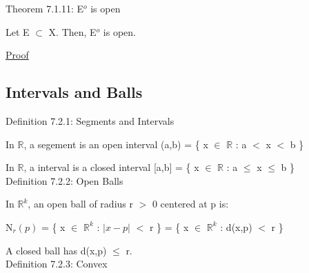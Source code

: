 	 \vspace{0.5cm}

{ \color{red} Theorem 7.1.11: E$^o$ is open }

	\begin{adjustbox}{minipage=14cm, right, vspace=0.1cm 0cm}
		Let  E $\subset$ X. Then, E$^o$ is open.
	\end{adjustbox}

{ \color{magenta} \underline{Proof} }


\subsection{ Intervals and Balls } 

{ \color{blue} Definition 7.2.1: Segments and Intervals } 

	\begin{adjustbox}{minipage=14cm, right, vspace=0.1cm 0cm}
		In $\mathbb{R}$, a {\color{lblue} segement} is an open interval
		(a,b) = \{ x $\in$ $\mathbb{R}$ : a $<$ x $<$ b \}

		In $\mathbb{R}$, a {\color{lblue} interval} is a closed interval
		[a,b] = \{ x $\in$ $\mathbb{R}$ : a $\leq$ x $\leq$ b \} \\
	\end{adjustbox}

{ \color{blue} Definition 7.2.2: Open Balls } 

	\begin{adjustbox}{minipage=14cm, right, vspace=0.1cm 0cm}
		In $\mathbb{R}^k$, an {\color{lblue} open ball} of radius
		r $>$ 0 centered at p is:

		\qquad N$_r(p)$ = \{ x $\in$ $\mathbb{R}^k$ : $|x-p|$ $<$ r \}
		= \{ x $\in$ $\mathbb{R}^k$ : d(x,p) $<$ r \}

		A {\color{lblue} closed ball} has d(x,p) $\leq$ r. \\
	\end{adjustbox}

{ \color{blue} Definition 7.2.3: Convex } 

